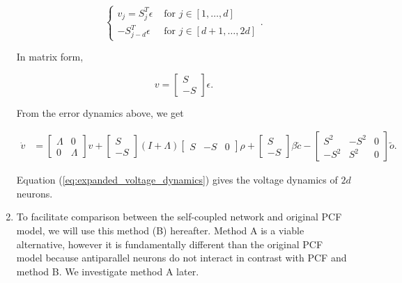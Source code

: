 \begin{enumerate}
$$
\begin{cases}
v_j = 
S_j^T \epsilon & \text{ for } j \in \left[1, \hdots, d \right]
\\
-S_{j-d}^T \epsilon & \text{ for } j \in \left[d+1, \hdots, 2d \right]
\end{cases}.
$$

In matrix form, 

$$
v = 
\begin{bmatrix}
S
\\
-S
\end{bmatrix}\epsilon.
$$


From the error dynamics above, we get

\begin{align}
\label{eq:expanded_voltage_dynamics}
\dot{v} &= 
\begin{bmatrix}
\Lambda  & 0
\\
0 & \Lambda 
\end{bmatrix} 
v
+
\begin{bmatrix}
S
\\
-S
\end{bmatrix} \left(I + \Lambda\right)
\begin{bmatrix}
S & -S & 0
\end{bmatrix}
\rho
+ \begin{bmatrix}
S
\\
-S
\end{bmatrix} \beta
\tilde{c}
-
\begin{bmatrix}
S^2 & -S^2 & 0
\\
-S^2 & S^2 & 0
\end{bmatrix}
\tilde{o}.
\end{align}

Equation (\ref{eq:expanded_voltage_dynamics}) gives the voltage dynamics of $2d$ neurons. 

\item To facilitate comparison between the self-coupled network and original PCF model, we will use this method (B) hereafter. Method A is a viable alternative, however it is fundamentally different than the original PCF model because antiparallel neurons do not interact in contrast with PCF and method B.  We investigate method A later. 
\end{enumerate}


\clearpage

